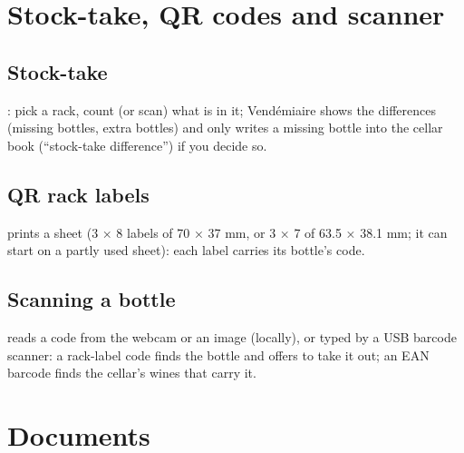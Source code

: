 \documentclass[11pt,a4paper]{article}
\begin{document}

\section{Stock-take, QR codes and scanner}
\subsection{Stock-take}
: pick a rack, count (or scan) what is in it; Vendémiaire shows the differences
(missing bottles, extra bottles) and only writes a missing bottle into the cellar book (``stock-take
difference'') if you decide so.


\subsection{QR rack labels}
 prints a sheet (3 × 8 labels of 70 × 37 mm, or 3 × 7 of 63.5 × 38.1 mm;
it can start on a partly used sheet): each label carries its bottle's code.


\subsection{Scanning a bottle}
 reads a code from the webcam or an image (locally), or typed by a USB barcode
scanner: a rack-label code finds the bottle and offers to take it out; an EAN barcode finds the cellar's wines
that carry it.


\section{Documents}
\end{document}
